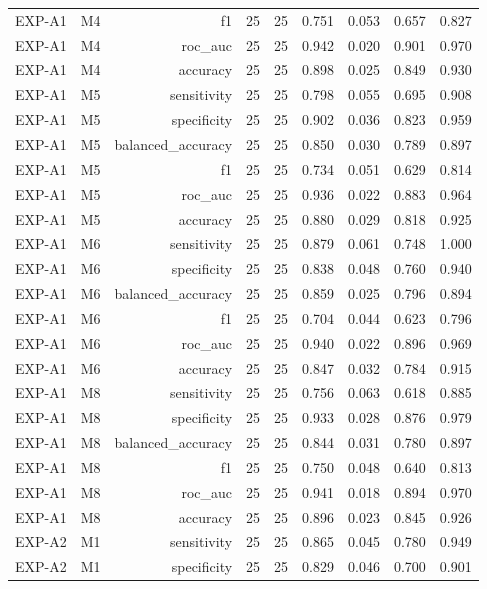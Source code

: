 \begin{table}[htbp]
\begin{tabular}{lrrrrrrrr}
    EXP-A1 & M4 & f1 & 25 & 25 & 0.751 & 0.053 & 0.657 & 0.827 \\
    EXP-A1 & M4 & roc\_auc & 25 & 25 & 0.942 & 0.020 & 0.901 & 0.970 \\
    EXP-A1 & M4 & accuracy & 25 & 25 & 0.898 & 0.025 & 0.849 & 0.930 \\
    EXP-A1 & M5 & sensitivity & 25 & 25 & 0.798 & 0.055 & 0.695 & 0.908 \\
    EXP-A1 & M5 & specificity & 25 & 25 & 0.902 & 0.036 & 0.823 & 0.959 \\
    EXP-A1 & M5 & balanced\_accuracy & 25 & 25 & 0.850 & 0.030 & 0.789 & 0.897 \\
    EXP-A1 & M5 & f1 & 25 & 25 & 0.734 & 0.051 & 0.629 & 0.814 \\
    EXP-A1 & M5 & roc\_auc & 25 & 25 & 0.936 & 0.022 & 0.883 & 0.964 \\
    EXP-A1 & M5 & accuracy & 25 & 25 & 0.880 & 0.029 & 0.818 & 0.925 \\
    EXP-A1 & M6 & sensitivity & 25 & 25 & 0.879 & 0.061 & 0.748 & 1.000 \\
    EXP-A1 & M6 & specificity & 25 & 25 & 0.838 & 0.048 & 0.760 & 0.940 \\
    EXP-A1 & M6 & balanced\_accuracy & 25 & 25 & 0.859 & 0.025 & 0.796 & 0.894 \\
    EXP-A1 & M6 & f1 & 25 & 25 & 0.704 & 0.044 & 0.623 & 0.796 \\
    EXP-A1 & M6 & roc\_auc & 25 & 25 & 0.940 & 0.022 & 0.896 & 0.969 \\
    EXP-A1 & M6 & accuracy & 25 & 25 & 0.847 & 0.032 & 0.784 & 0.915 \\
    EXP-A1 & M8 & sensitivity & 25 & 25 & 0.756 & 0.063 & 0.618 & 0.885 \\
    EXP-A1 & M8 & specificity & 25 & 25 & 0.933 & 0.028 & 0.876 & 0.979 \\
    EXP-A1 & M8 & balanced\_accuracy & 25 & 25 & 0.844 & 0.031 & 0.780 & 0.897 \\
    EXP-A1 & M8 & f1 & 25 & 25 & 0.750 & 0.048 & 0.640 & 0.813 \\
    EXP-A1 & M8 & roc\_auc & 25 & 25 & 0.941 & 0.018 & 0.894 & 0.970 \\
    EXP-A1 & M8 & accuracy & 25 & 25 & 0.896 & 0.023 & 0.845 & 0.926 \\
    EXP-A2 & M1 & sensitivity & 25 & 25 & 0.865 & 0.045 & 0.780 & 0.949 \\
    EXP-A2 & M1 & specificity & 25 & 25 & 0.829 & 0.046 & 0.700 & 0.901 \\

\end{tabular}
\end{table}
